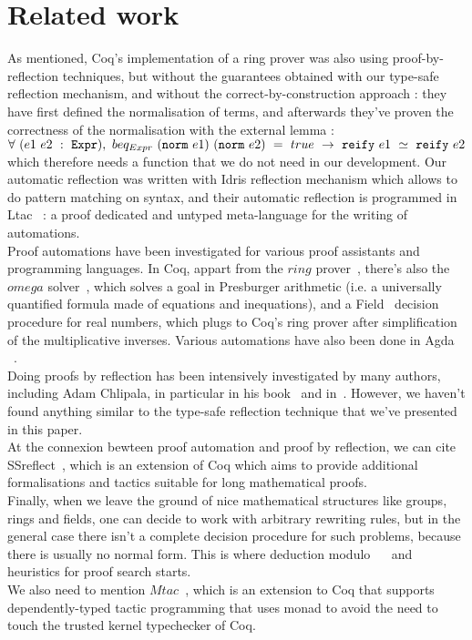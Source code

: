 \section{Related work}
\label{sect:relatedWork}

As mentioned, Coq's implementation of a ring prover was also using proof-by-reflection techniques, but without the guarantees obtained with our type-safe reflection mechanism, and without the correct-by-construction approach : they have first defined the normalisation of terms, and afterwards they've proven the correctness of the normalisation with the external lemma :
$\forall\ (e1\ e2\ :\ \code{Expr}),\ beq_{Expr}\ (\code{norm}\ e1)\ (\code{norm}\ e2)\ =\ true\ \rightarrow\ \code{reify}\ e1\ \simeq\ \code{reify}\ e2$ which therefore needs a  function that we do not need in our development.
Our automatic reflection was written with Idris reflection mechanism which allows to do pattern matching on syntax, and their automatic reflection is programmed in Ltac~\cite{DelahayeLTac} : a proof dedicated and untyped meta-language for the writing of automations. \\

Proof automations have been investigated for various proof assistants and programming languages. In Coq, appart from the $ring$ prover~\cite{Coq2005}, there's also the $omega$ solver~\cite{Cregut04}, which solves a goal in Presburger arithmetic (i.e. a universally quantified formula made of equations and inequations), and a Field~\cite{DelahayeField} decision procedure for real numbers, which plugs to Coq's ring prover after simplification of the multiplicative inverses. Various automations have also been done in Agda~\cite{DBLP:conf/mpc/KokkeS15} ~\cite{Lindblad04}. \\

Doing proofs by reflection has been intensively investigated by many authors, including Adam Chlipala, in particular in his book~\cite{ChlipalaBook} and in~\cite{Malecha14}. However, we haven't found anything similar to the type-safe reflection technique that we've presented in this paper. \\

At the connexion bewteen proof automation and proof by reflection, we can cite SSreflect~\cite{GonthierTuto}, which is an extension of Coq which aims to provide additional formalisations and tactics suitable for long mathematical proofs. \\

Finally, when we leave the ground of nice mathematical structures like groups, rings and fields, one can decide to work with arbitrary rewriting rules, but in the general case there isn't a complete decision procedure for such problems, because there is usually no normal form. This is where deduction modulo~\cite{Dowek03} ~\cite{DelahayeModulo} and heuristics for proof search starts. \\

We also need to mention $Mtac$~\cite{Ziliani13}, which is an extension to Coq that supports dependently-typed tactic programming that uses monad to avoid the need to touch the trusted kernel typechecker of Coq.


